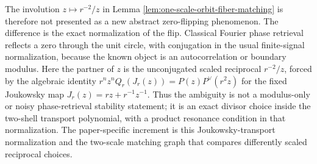 The involution \(z\mapsto r^{-2}/z\) in Lemma
\ref{lem:one-scale-orbit-fiber-matching} is therefore not presented as
a new abstract zero-flipping phenomenon.  The difference is the exact
normalization of the flip.  Classical Fourier phase retrieval reflects a
zero through the unit circle, with conjugation in the usual
finite-signal normalization, because the known object is an
autocorrelation or boundary modulus.  Here the partner of \(z\) is the
unconjugated scaled reciprocal \(r^{-2}/z\), forced by the algebraic
identity
\(r^nz^nQ_r(J_r(z))=P(z)P^\vee(r^2z)\) for the fixed Joukowsky map
\(J_r(z)=rz+r^{-1}z^{-1}\).  Thus the ambiguity is not a modulus-only
or noisy phase-retrieval stability statement; it is an exact divisor
choice inside the two-shell transport polynomial, with a product
resonance condition in that normalization.  The paper-specific increment
is this Joukowsky-transport normalization and the two-scale matching
graph that compares differently scaled reciprocal choices.

